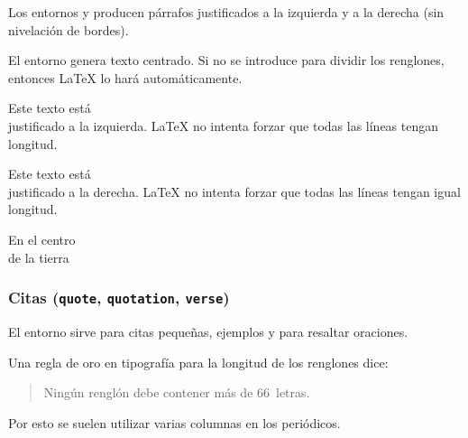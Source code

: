 Los  entornos     y    producen  párrafos
justificados  a  la  izquierda  y  a la  derecha  (sin  nivelación  de
bordes).%

  El entorno   genera texto  centrado. Si  no se
introduce \ci{\bs}  para dividir  los renglones, entonces  \LaTeX{} lo
hará automáticamente.

\begin{example}
\begin{flushleft}
Este texto está\\ justificado a
la izquierda. \LaTeX{} no intenta
forzar que todas las líneas
tengan longitud.
\end{flushleft}
\end{example}

\begin{example}
\begin{flushright}
Este texto está\\ justificado a
la derecha. \LaTeX{} no intenta
forzar que todas las líneas
tengan igual longitud.
\end{flushright}
\end{example}

\begin{example}
\begin{center}
En el centro\\de la tierra
\end{center}
\end{example}

\subsubsection{Citas        (\texttt{quote},       \texttt{quotation},
\texttt{verse})}

El  entorno   sirve  para citas  pequeñas,  ejemplos y  para
resaltar oraciones.

\begin{example}
Una regla de oro en tipografía
para la longitud de los renglones
dice:
\begin{quote}
Ningún renglón debe contener
más de 66~letras.
\end{quote}
Por esto se suelen utilizar varias
columnas en los periódicos.
\end{example}



